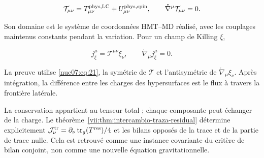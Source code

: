 \begin{equation}
\mathcal T_{\mu\nu}
=T^{\rm phys,LC}_{\mu\nu}+U^{\rm phys,spin}_{\mu\nu},
\qquad
\mathring\nabla^\mu\mathcal T_{\mu\nu}=0.
\label{nuc07:eq:21}
\end{equation}

Son domaine est le système de coordonnées HMT–MD réalisé, avec les couplages maintenus constants pendant la variation. Pour un champ de Killing \(\xi\),

\begin{equation}
j^\mu_\xi=\mathcal T^{\mu\nu}\xi_\nu,\qquad
\mathring\nabla_\mu j^\mu_\xi=0.
\label{nuc07:eq:22}
\end{equation}

La preuve utilise \eqref{nuc07:eq:21}, la symétrie de \(\mathcal T\) et l’antisymétrie de \(\mathring\nabla_\mu\xi_\nu\). Après intégration, la différence entre les charges des hypersurfaces est le flux à travers la frontière latérale.

La conservation appartient au tenseur total ; chaque composante peut échanger de la charge. Le théorème~\ref{vii:thm:intercambio-traza-residual} détermine explicitement \(\mathcal J^{\rm tr}_\nu=\partial_\nu\operatorname{tr}_g(T^{\rm res})/4\) et les bilans opposés de la trace et de la partie de trace nulle. Cela est retrouvé comme une instance covariante du critère de bilan conjoint, non comme une nouvelle équation gravitationnelle.
